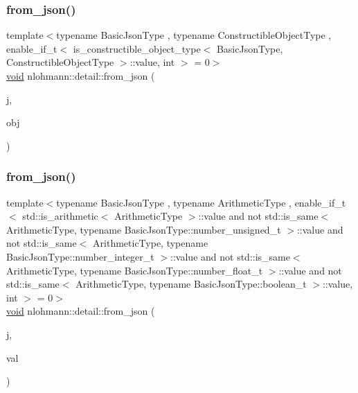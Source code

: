 \mbox{\label{namespacenlohmann_1_1detail_a5b24896e5f5db6af06d939dde4b63fe1}} 
\subsubsection{\texorpdfstring{from\+\_\+json()}{from\_json()}\hspace{0.1cm}{\footnotesize\ttfamily [13/18]}}
{\footnotesize\ttfamily template$<$typename Basic\+Json\+Type , typename Constructible\+Object\+Type , enable\+\_\+if\+\_\+t$<$ is\+\_\+constructible\+\_\+object\+\_\+type$<$ Basic\+Json\+Type, Constructible\+Object\+Type $>$\+::value, int $>$  = 0$>$ \\
\hyperlink{namespacenlohmann_1_1detail_a59fca69799f6b9e366710cb9043aa77d}{void} nlohmann\+::detail\+::from\+\_\+json (\begin{DoxyParamCaption}\item[{const Basic\+Json\+Type \&}]{j,  }\item[{Constructible\+Object\+Type \&}]{obj }\end{DoxyParamCaption})}

\mbox{\label{namespacenlohmann_1_1detail_a839b0ab50d2c9bce669068f56bc41202}} 
\subsubsection{\texorpdfstring{from\+\_\+json()}{from\_json()}\hspace{0.1cm}{\footnotesize\ttfamily [14/18]}}
{\footnotesize\ttfamily template$<$typename Basic\+Json\+Type , typename Arithmetic\+Type , enable\+\_\+if\+\_\+t$<$ std\+::is\+\_\+arithmetic$<$ Arithmetic\+Type $>$\+::value and not std\+::is\+\_\+same$<$ Arithmetic\+Type, typename Basic\+Json\+Type\+::number\+\_\+unsigned\+\_\+t $>$\+::value and not std\+::is\+\_\+same$<$ Arithmetic\+Type, typename Basic\+Json\+Type\+::number\+\_\+integer\+\_\+t $>$\+::value and not std\+::is\+\_\+same$<$ Arithmetic\+Type, typename Basic\+Json\+Type\+::number\+\_\+float\+\_\+t $>$\+::value and not std\+::is\+\_\+same$<$ Arithmetic\+Type, typename Basic\+Json\+Type\+::boolean\+\_\+t $>$\+::value, int $>$  = 0$>$ \\
\hyperlink{namespacenlohmann_1_1detail_a59fca69799f6b9e366710cb9043aa77d}{void} nlohmann\+::detail\+::from\+\_\+json (\begin{DoxyParamCaption}\item[{const Basic\+Json\+Type \&}]{j,  }\item[{Arithmetic\+Type \&}]{val }\end{DoxyParamCaption})}

